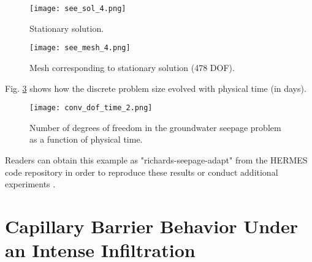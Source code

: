 \documentclass[final,3p,times,twocolumn]{elsarticle}
\begin{document}
\begin{figure}[!ht]
\begin{center}
\texttt{[image: see\_sol\_4.png]}
\end{center}
\vspace{-6mm}
\caption{Stationary solution.}
\label{fig:see-sol-4}
\end{figure}

\begin{figure}[!ht]
\begin{center}
\hspace{6mm}
\texttt{[image: see\_mesh\_4.png]}
\end{center}
\vspace{-6mm}
\caption{Mesh corresponding to stationary solution (478 DOF).}
\label{fig:see-mesh-4}
\end{figure}

Fig. \ref{fig:conv-dof_time_2} shows how the discrete problem size 
evolved with physical time (in days). 

\begin{figure}[!ht]
\begin{center}
\texttt{[image: conv\_dof\_time\_2.png]}
\end{center}
\vspace{-6mm}
\caption{Number of degrees of freedom in the groundwater seepage problem 
         as a function of physical time.}
\label{fig:conv-dof_time_2}
\end{figure}

Readers can obtain this example as "richards-seepage-adapt" from the 
HERMES code repository in order to reproduce these results or conduct 
additional experiments \cite{hermes-repo}.

\section{Capillary Barrier Behavior Under an Intense Infiltration}
\label{sec:example-barrier}
\end{document}
